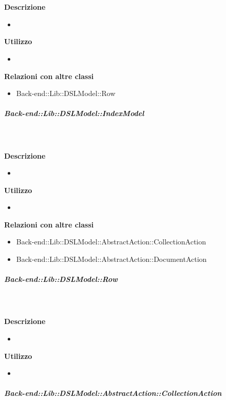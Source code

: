         \textbf{\\ \\ Descrizione} 
          \begin{itemize}
            \item[] 
          \end{itemize}      
        \textbf{Utilizzo}  
          \begin{itemize}
            \item[] 
          \end{itemize}
          \textbf{Relazioni con altre classi}
          \begin{itemize}
              \item{Back-end::Lib::DSLModel::Row}
          \end{itemize}
      \subparagraph{Back-end::Lib::DSLModel::IndexModel}
        
        \textbf{\\ \\ Descrizione} 
          \begin{itemize}
            \item[] 
          \end{itemize}      
        \textbf{Utilizzo}  
          \begin{itemize}
            \item[] 
          \end{itemize}
          \textbf{Relazioni con altre classi}
          \begin{itemize}
              \item{Back-end::Lib::DSLModel::AbstractAction::CollectionAction}
              \item{Back-end::Lib::DSLModel::AbstractAction::DocumentAction}
          \end{itemize}
      \subparagraph{Back-end::Lib::DSLModel::Row}
        
        \textbf{\\ \\ Descrizione} 
          \begin{itemize}
            \item[] 
          \end{itemize}      
        \textbf{Utilizzo}  
          \begin{itemize}
            \item[] 
          \end{itemize}
      \subparagraph{Back-end::Lib::DSLModel::AbstractAction::CollectionAction}
        
